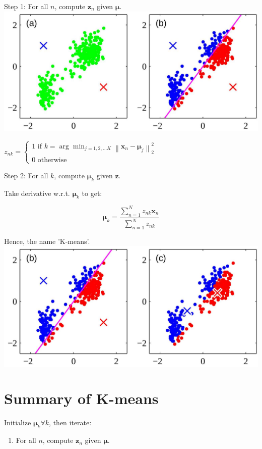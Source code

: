 \documentclass[10pt]{article}
\begin{document}
Step 1: For all $n$, compute $\mathbf{z}_{n}$ given $\boldsymbol{\mu}$.
\includegraphics[max width=\textwidth, center]{2023_12_30_43b7e6c218cb987b5fcag-3}

$z_{n k}=\left\{\begin{array}{l}1 \text { if } k=\arg \min _{j=1,2, \ldots K}\left\|\mathbf{x}_{n}-\boldsymbol{\mu}_{j}\right\|_{2}^{2} \\ 0 \text { otherwise }\end{array}\right.$

Step 2: For all $k$, compute $\boldsymbol{\mu}_{k}$ given $\mathbf{z}$.

Take derivative w.r.t. $\boldsymbol{\mu}_{k}$ to get:

$$
\boldsymbol{\mu}_{k}=\frac{\sum_{n=1}^{N} z_{n k} \mathbf{x}_{n}}{\sum_{n=1}^{N} z_{n k}}
$$

Hence, the name 'K-means'.
\includegraphics[max width=\textwidth, center]{2023_12_30_43b7e6c218cb987b5fcag-4}

\section*{Summary of K-means}
Initialize $\boldsymbol{\mu}_{k} \forall k$, then iterate:

\begin{enumerate}
  \item For all $n$, compute $\mathbf{z}_{n}$ given $\boldsymbol{\mu}$.
\end{enumerate}
\end{document}
